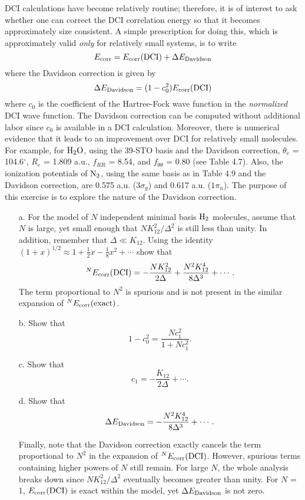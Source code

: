 \documentclass[a4paper]{book}
\newcommand{\corr}{{\rm corr}}
\begin{document}
	\begin{exercise}
	DCI calculations have become relatively routine; therefore, it is of interest to ask whether one can correct the DCI correlation energy so that it becomes approximately size consistent. A simple prescription for doing this, which is approximately valid {\it only} for relatively small systems, is to write
	\[
		E_\corr = E_\corr( {\rm DCI} ) + \Delta E_{\rm Davidson}
	\]
	where the Davidson correction is given by
	\[
		\Delta E_{\rm Davidson} = ( 1 - c^2_0 ) E_\corr( {\rm DCI} )
	\]
	where $c_0$ is the coefficient of the Hartree-Fock wave function in the {\it normalized} DCI wave function. The Davidson correction can be computed without additional labor since $c_0$ is available in a DCI calculation. Moreover, there is numerical evidence that it leads to an improvement over DCI for relatively small molecules. For example, for $\ce{H2O}$, using the 39-STO basis and the Davidson correction, $\theta_e$ = 104.6$^\circ$, $R_e$ = 1.809 a.u., $f_{RR}$ = 8.54, and $f_{\theta\theta}$ = 0.80 (see Table 4.7). Also, the ionization potentials of $\ce{N2}$, using the same basis as in Table 4.9 and the Davidson correction, are 0.575 a.u. ($3\sigma_g$) and 0.617 a.u. ($1\pi_u$). The purpose of this exercise is to explore the nature of the Davidson correction.
	\begin{enumerate}
	
	\item[a.] For the model of $N$ independent minimal basis $\ce{H2}$ molecules, assume that $N$ is large, yet small enough that $NK^2_{12}/\Delta^2$ is still less than unity. In addition, remember that $\Delta \ll K_{12}$. Using the identity $( 1 + x )^{1/2} \approx 1 + \frac{1}{2} x - \frac{1}{8} x^2 + \cdots$ show that
	\[
		{}^N E_\corr( {\rm DCI} ) = - \frac{ N K^2_{12} }{ 2\Delta } + \frac{ N^2 K^4_{12} }{ 8\Delta^3 } + \cdots.
	\]	
	The term proportional to $N^2$ is spurious and is not present in the similar expansion of ${}^N E_\corr( {\rm exact} )$.
	
	\item[b.] Show that
	\[
		1 - c^2_0 = \frac{ N c^2_1 }{ 1 + N c^2_1 }.
	\]
	
	\item[c.] Show that
	\[
		c_1 = - \frac{ K_{12} }{ 2\Delta } + \cdots.
	\]	
	
	\item[d.] Show that
	\[
		\Delta E_{\rm Davidson} = - \frac{ N^2 K^4_{12} }{ 8 \Delta^3 } + \cdots .
	\]

	Finally, note that the Davidson correction exactly cancels the term proportional to $N^2$ in the expansion of ${}^N E_\corr( {\rm DCI} )$. However, spurious terms containing higher powers of $N$ still remain. For large $N$, the whole analysis breaks down since $N K^2_{12} / \Delta^2$ eventually becomes greater than unity. For $N$ = 1, $E_\corr( {\rm DCI} )$ is exact within the model, yet $\Delta E_{\rm Davidson}$ is not zero.
	

\end{enumerate}
\end{exercise}
\end{document}
